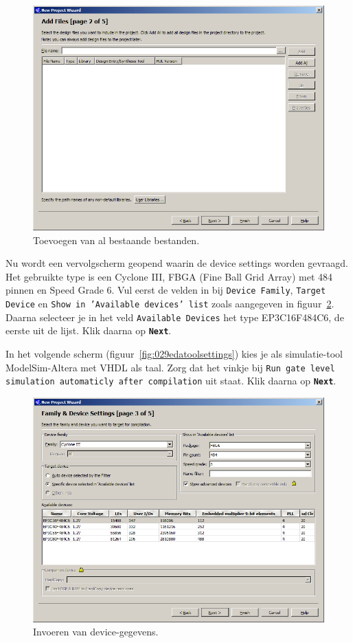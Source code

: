 \documentclass[a4paper,12pt,fleqn,twoside]{book}
\def\tutpicscale{0.455}
\newcommand{\knop}[1]{\texttt{\textbf{#1}}}
\newcommand{\naam}[1]{\texttt{#1}}
\begin{document}
\begin{figure}[H]
\centering
\includegraphics[scale=\tutpicscale]{027addfiles.png}
\caption{Toevoegen van al bestaande bestanden.}
\label{fig:027addfiles}
\end{figure}

Nu wordt een vervolgscherm geopend waarin de device settings worden gevraagd.
Het gebruikte type is een Cyclone III, FBGA (Fine Ball Grid Array) met 484
pinnen en Speed Grade 6. Vul eerst de velden in bij \naam{Device Family},
\naam{Target Device} en \naam{Show in 'Available devices' list} zoals
aangegeven in figuur~\ref{fig:028familydevicesettings}. Daarna selecteer je in
het veld \naam{Available Devices} het type EP3C16F484C6, de eerste uit de
lijst. Klik daarna op \knop{Next}.

In het volgende scherm (figuur~\ref{fig:029edatoolsettings}) kies je als
simulatie-tool ModelSim-Altera met VHDL als taal. Zorg dat het vinkje bij
\naam{Run gate level simulation automaticly after compilation} uit staat.
Klik daarna op \knop{Next}.
 
\begin{figure}[H]
\centering
\includegraphics[scale=\tutpicscale]{028familydevicesettings.png}
\caption{Invoeren van device-gegevens.}
\label{fig:028familydevicesettings}
\end{figure}
 
\end{document}
